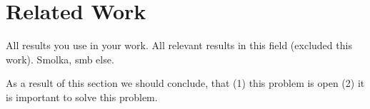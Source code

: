 \section{Related Work}

All results you use in your work.
All relevant results in this field (excluded this work).
Smolka, smb else. 

As a result of this section we should conclude, that (1) this problem is open (2) it is important to solve this problem.

